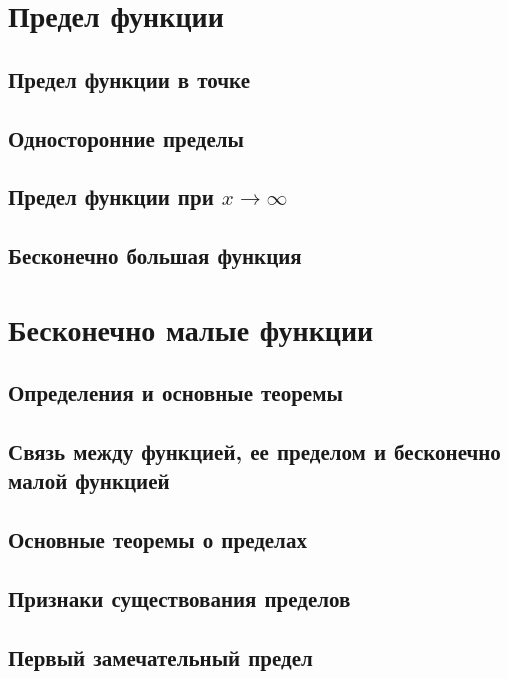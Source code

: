 \documentclass[14pt]{extreport}
\begin{document}
\chapter{Предел функции}

\section{Предел функции в точке}

\section{Односторонние пределы}

\section{Предел функции при $x\to\infty$}

\section{Бесконечно большая функция}



\chapter{Бесконечно малые функции}

\section{Определения и основные теоремы}

\section{Связь между функцией, ее пределом и бесконечно малой функцией}

\section{Основные теоремы о пределах}

\section{Признаки существования пределов}

\section{Первый замечательный предел}
\end{document}
